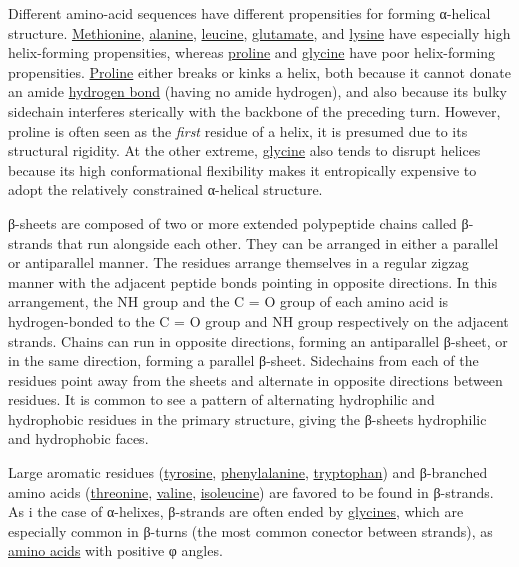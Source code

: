 \documentclass[
  letterpaper,
  DIV=11,
  numbers=noendperiod]{scrreprt}
\begin{document}
Different amino-acid sequences have different propensities for forming
α-helical structure.
\href{https://en.wikipedia.org/wiki/Methionine}{Methionine},
\href{https://en.wikipedia.org/wiki/Alanine}{alanine},
\href{https://en.wikipedia.org/wiki/Leucine}{leucine},
\href{https://en.wikipedia.org/wiki/Glutamate}{glutamate}, and
\href{https://en.wikipedia.org/wiki/Lysine}{lysine} have especially high
helix-forming propensities, whereas
\href{https://en.wikipedia.org/wiki/Proline}{proline} and
\href{https://en.wikipedia.org/wiki/Glycine}{glycine} have poor
helix-forming propensities.
\href{https://en.wikipedia.org/wiki/Proline}{Proline} either breaks or
kinks a helix, both because it cannot donate an amide
\href{https://en.wikipedia.org/wiki/Hydrogen_bond}{hydrogen bond}
(having no amide hydrogen), and also because its bulky sidechain
interferes sterically with the backbone of the preceding turn. However,
proline is often seen as the \emph{first} residue of a helix, it is
presumed due to its structural rigidity. At the other extreme,
\href{https://en.wikipedia.org/wiki/Glycine}{glycine} also tends to
disrupt helices because its high conformational flexibility makes it
entropically expensive to adopt the relatively constrained α-helical
structure.

β-sheets are composed of two or more extended polypeptide chains called
β-strands that run alongside each other. They can be arranged in either
a parallel or antiparallel manner. The residues arrange themselves in a
regular zigzag manner with the adjacent peptide bonds pointing in
opposite directions. In this arrangement, the NH group and the C = O
group of each amino acid is hydrogen-bonded to the C = O group and NH
group respectively on the adjacent strands. Chains can run in opposite
directions, forming an antiparallel β-sheet, or in the same direction,
forming a parallel β-sheet. Sidechains from each of the residues point
away from the sheets and alternate in opposite directions between
residues. It is common to see a pattern of alternating hydrophilic and
hydrophobic residues in the primary structure, giving the β-sheets
hydrophilic and hydrophobic faces.

Large aromatic residues
(\href{https://en.wikipedia.org/wiki/Tyrosine}{tyrosine},
\href{https://en.wikipedia.org/wiki/Phenylalanine}{phenylalanine},
\href{https://en.wikipedia.org/wiki/Tryptophan}{tryptophan}) and
β-branched amino acids
(\href{https://en.wikipedia.org/wiki/Threonine}{threonine},
\href{https://en.wikipedia.org/wiki/Valine}{valine},
\href{https://en.wikipedia.org/wiki/Isoleucine}{isoleucine}) are favored
to be found in β-strands. As i the case of α-helixes, β-strands are
often ended by \href{https://en.wikipedia.org/wiki/Glycine}{glycines},
which are especially common in β-turns (the most common conector between
strands), as \href{https://en.wikipedia.org/wiki/Amino_acid}{amino
acids} with positive φ angles.
\end{document}
